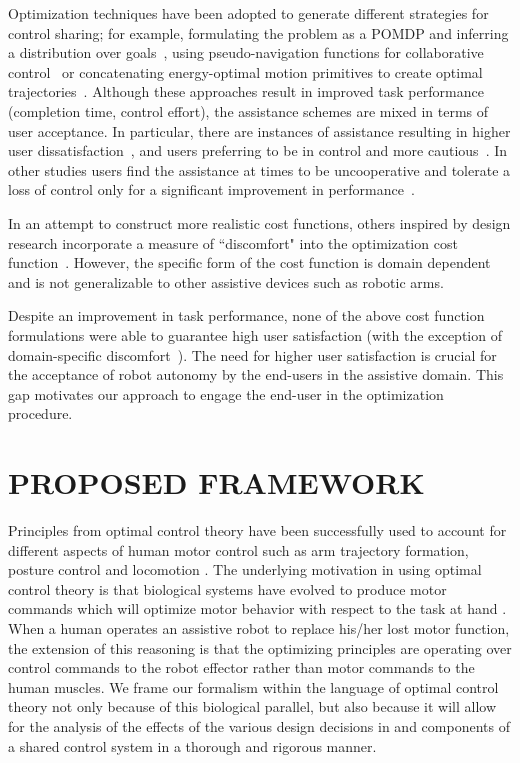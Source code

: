 \documentclass[letterpaper, 10 pt, journal, twoside]{IEEEtran}  %
\begin{document}
	
	Optimization techniques have been adopted to generate different strategies for control sharing; for example, formulating the problem as a POMDP and inferring a distribution over goals~\cite{javdani2015shared}, using pseudo-navigation functions for collaborative control~\cite{fernandez2015towards} or concatenating energy-optimal motion primitives to create optimal trajectories~\cite{lawitzky2013trajectory}. Although these approaches result in improved task performance (completion time, control effort), the assistance schemes are mixed in terms of user acceptance. In particular, there are instances of assistance resulting in higher user dissatisfaction~\cite{javdani2015shared}, and users preferring to be in control and more cautious~\cite{lawitzky2013trajectory}. In other studies users find the assistance at times to be uncooperative and tolerate a loss of control only for a significant improvement in performance~\cite{you2012assisted}.
	
	In an attempt to construct more realistic cost functions, others inspired by design research incorporate a measure of ``discomfort" into the optimization cost function~\cite{gulati2009framework}. However, the specific form of the cost function is domain dependent and is not generalizable to other assistive devices such as robotic arms. 
	
	Despite an improvement in task performance, none of the above cost function formulations were able to guarantee high user satisfaction (with the exception of domain-specific discomfort~\cite{gulati2009framework}). The need for higher user satisfaction is crucial for the acceptance of robot autonomy by the end-users in the assistive domain. This gap motivates our approach to engage the end-user in the optimization procedure.
	
	\section{PROPOSED FRAMEWORK} \label{pf}
	
	Principles from optimal control theory have been successfully used to account for different aspects of human motor control such as  arm trajectory formation, posture control and locomotion \cite{ uno1989formation, flash1985coordination,todorov2004optimality}.
	The underlying motivation in using optimal control theory is that biological systems have evolved to produce motor commands which will optimize motor behavior with respect to the task at hand \cite{todorov2004optimality}. When a human operates an assistive robot to replace his/her lost motor function, the extension of this reasoning is that the optimizing principles are operating over control commands to the robot effector rather than motor commands to the human muscles.
	We frame our formalism within the language of optimal control theory not only because of this biological parallel, but also because it will allow for the analysis of the effects of the various design decisions in and components of a shared control system in a thorough and rigorous manner. 
	
\end{document}

